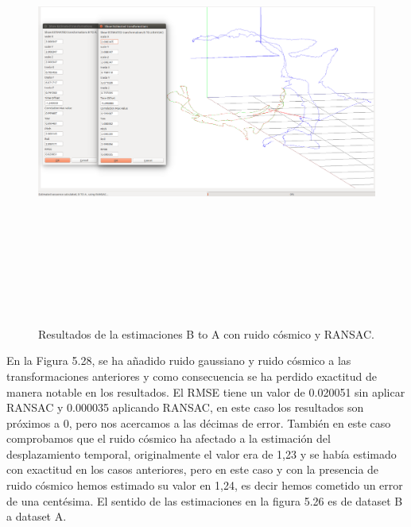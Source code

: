 \begin{figure}[H]
\begin{center}
\label{fig:opciones de View}\includegraphics[height=14.0cm,width=18.0cm]{img/cap6/newData_EscalaTraslaRotaGaussCosmic_ba.png}
\hspace{0.5cm}
\end{center}

\caption{Resultados de la estimaciones B to A con ruido cósmico y RANSAC.}
\end{figure}
En la Figura 5.28, se ha añadido ruido gaussiano y ruido cósmico a las transformaciones anteriores y como consecuencia se ha perdido exactitud de manera notable en los resultados. 
El RMSE tiene un valor de 0.020051 sin aplicar RANSAC y 0.000035 aplicando RANSAC, en este caso los resultados son próximos a 0, pero nos acercamos a las décimas de error.
También en este caso comprobamos que el ruido cósmico ha afectado a la estimación del desplazamiento temporal, originalmente el valor era de 1,23 y se había estimado con exactitud en los casos anteriores, pero en este caso y con la presencia de ruido cósmico hemos estimado su valor en 1,24, es decir hemos cometido un error de una centésima.
El sentido de las estimaciones en la figura 5.26 es de dataset B a dataset A.


